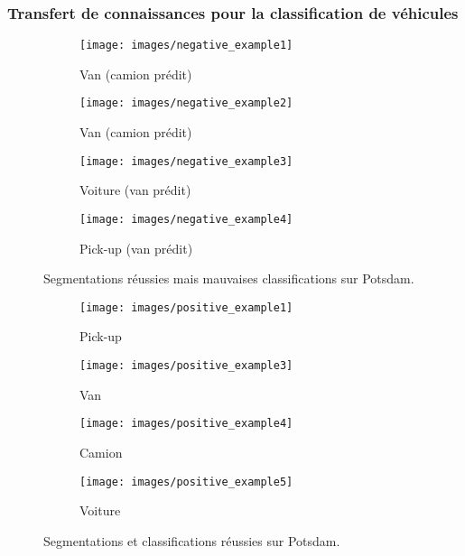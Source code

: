 \subsubsection{Transfert de connaissances pour la classification de véhicules}
\begin{figure}[t]
\centering
   \begin{subfigure}{0.24\textwidth}
     \texttt{[image: images/negative\_example1]}
     \caption{Van (camion prédit)}
   \end{subfigure}
  \begin{subfigure}{0.24\textwidth}
    \texttt{[image: images/negative\_example2]}
    \caption{Van (camion prédit)}
  \end{subfigure}
  \begin{subfigure}{0.24\textwidth}
    \texttt{[image: images/negative\_example3]}
    \caption{Voiture (van prédit)}
  \end{subfigure}
  \begin{subfigure}{0.24\textwidth}
    \texttt{[image: images/negative\_example4]}
    \caption{Pick-up (van prédit)}
  \end{subfigure}
  \caption{Segmentations réussies mais mauvaises classifications sur Potsdam.}
  \label{fig:negative_examples}
\end{figure}
\unskip
\begin{figure}[t]
\centering
  \begin{subfigure}{0.24\textwidth}
    \texttt{[image: images/positive\_example1]}
    \caption{Pick-up}
  \end{subfigure}
  \begin{subfigure}{0.24\textwidth}
    \texttt{[image: images/positive\_example3]}
    \caption{Van}
  \end{subfigure}
  \begin{subfigure}{0.24\textwidth}
    \texttt{[image: images/positive\_example4]}
    \caption{Camion}
  \end{subfigure}
  \begin{subfigure}{0.24\textwidth}
    \texttt{[image: images/positive\_example5]}
    \caption{Voiture}
  \end{subfigure}

  \caption{Segmentations et classifications réussies sur Potsdam.}
  \label{fig:positive_examples}
\end{figure}

